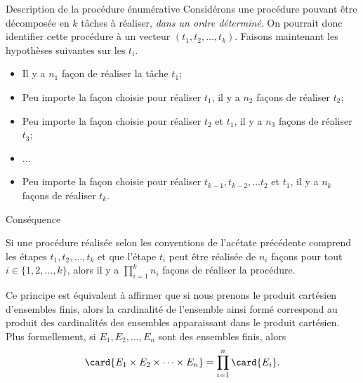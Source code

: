 \documentclass[nuit,charter,pied]{BeamerJS}
\begin{document}
\begin{frame}{Description de la procédure énumérative}
\pause
	Considérons une procédure pouvant être décomposée en $k$ tâches à réaliser, \emph{dans un ordre déterminé}. \pause On pourrait donc identifier cette procédure à un vecteur $(t_1,t_2,\ldots,t_k)$.\pause
Faisons maintenant les hypothèses suivantes sur les $t_i$.\pause
\begin{itemize}
\item Il y a $n_1$ façon de réaliser la tâche $t_1$;\pause
\item Peu importe la façon choisie pour réaliser $t_1$, il y a $n_2$ façons de réaliser $t_2$;\pause
\item Peu importe la façon choisie pour réaliser $t_2$ et $t_1$, il y a $n_3$ façons de réaliser $t_3$;\pause
\item $\ldots$\pause
\item Peu importe la façon choisie pour réaliser $t_{k-1},t_{k-2},\ldots t_2$ et $t_1$, il y a $n_k$ façons de réaliser $t_k$.
\end{itemize}
\end{frame}
\begin{frame}{Conséquence}
\pause
	\begin{prop}
Si une procédure réalisée selon les conventions de l'acétate précédente comprend les étapes $t_1,t_2,\ldots,t_k$ et que l'étape $t_i$ peut être réalisée de $n_i$ façons pour tout $i\in\{1,2,\ldots,k\}$, alors il y a $\prod_{i=1}^k n_i$ façons de réaliser la procédure.
\end{prop}
\pause
Ce principe est équivalent à affirmer que si nous prenons le produit cartésien d'ensembles finis, alors la cardinalité de l'ensemble ainsi formé correspond au produit des cardinalités des ensembles apparaissant dans le produit cartésien. \pause Plus formellement, si $E_1,E_2,\ldots, E_n$ sont des ensembles finis, alors
\[\card{E_1\times E_2\times \cdots\times E_n}=\prod_{i=1}^n\card{E_i}.\]
\end{frame}
\end{document}
